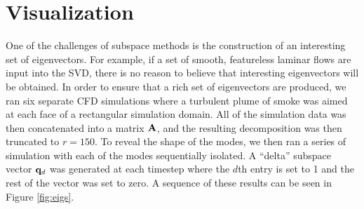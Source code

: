 \documentclass[11pt]{article}
\begin{document}

\section*{Visualization}

One of the challenges of subspace methods is the construction of an interesting set of eigenvectors. For example, if a set of smooth, featureless laminar flows are input into the SVD, there is no reason to believe that interesting eigenvectors will be obtained. In order to ensure that a rich set of eigenvectors are produced, we ran six separate CFD simulations where a turbulent plume of smoke was aimed at each face of a rectangular simulation domain. All of the simulation data was then concatenated into a matrix $\mathbf{A}$, and the resulting decomposition was then truncated to $r = 150$. To reveal the shape of the modes, we then ran a series of simulation with each of the modes sequentially isolated. A ``delta'' subspace vector $\mathbf{q}_d$ was generated at each timestep where the $d$th entry is set to 1 and the rest of the vector was set to zero. A sequence of these results can be seen in Figure \ref{fig:eigs}.
\end{document}
